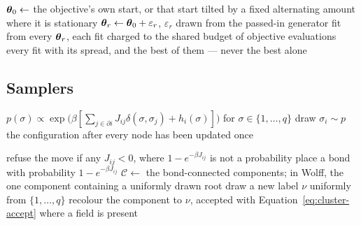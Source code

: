 \documentclass[11pt,a4paper]{article}
\begin{document}
\begin{algorithm}[htbp]
\caption{Multi-start from a generator, at a declared budget}
\label{alg:random-restart}
\begin{algorithmic}[1]
\State $\boldsymbol{\theta}_0 \gets$ the objective's own start, or that start tilted by a
       fixed alternating amount where it is stationary
  \State $\boldsymbol{\theta}_r \gets \boldsymbol{\theta}_0 + \varepsilon_r$, $\varepsilon_r$ drawn
         from the passed-in generator
\EndFor
\State fit from every $\boldsymbol{\theta}_r$, each fit charged to the shared budget of
       objective evaluations
\State \Return every fit with its spread, and the best of them --- never the
       best alone
\end{algorithmic}
\end{algorithm}

\subsection{Samplers}
\label{app:algorithms:samplers}

\begin{algorithm}[htbp]
\caption{One heat-bath sweep at inverse temperature $\beta$,
Equation~\ref{eq:heat-bath}}
\label{alg:heat-bath}
\begin{algorithmic}[1]
  \State $p(\sigma) \propto \exp\!\big(\beta [\sum_{j \in \partial i} J_{ij}
         \delta(\sigma, \sigma_j) + h_i(\sigma)]\big)$ for
         $\sigma \in \{1, \dots, q\}$
  \State draw $\sigma_i \sim p$ 
\EndFor
\State \Return the configuration after every node has been updated once
\end{algorithmic}
\end{algorithm}

\begin{algorithm}[htbp]
\caption{A cluster move at zero field, Edwards--Sokal bonds}
\label{alg:cluster-move}
\begin{algorithmic}[1]
\State refuse the move if any $J_{ij} < 0$, where $1 - e^{-\beta J_{ij}}$ is
       not a probability
  \State place a bond with probability $1 - e^{-\beta J_{ij}}$
\EndFor
\State $\mathcal{C} \gets$ the bond-connected components; in Wolff, the one
       component containing a uniformly drawn root
  \State draw a new label $\nu$ uniformly from $\{1, \dots, q\}$
  \State recolour the component to $\nu$, accepted with
         Equation~\ref{eq:cluster-accept} where a field is present
\EndFor
\end{algorithmic}
\end{algorithm}
\end{document}
